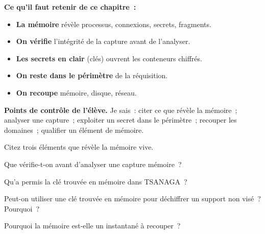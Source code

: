 \separateur

\begin{boxresume}
\textbf{Ce qu'il faut retenir de ce chapitre~:}
\begin{itemize}
    \item \textbf{La mémoire} révèle processus, connexions, secrets,
          fragments.
    \item \textbf{On vérifie} l'intégrité de la capture avant de l'analyser.
    \item \textbf{Les secrets en clair} (clés) ouvrent les conteneurs
          chiffrés.
    \item \textbf{On reste dans le périmètre} de la réquisition.
    \item \textbf{On recoupe} mémoire, disque, réseau.
\end{itemize}
\end{boxresume}

\begin{boxinfo}
\textbf{Points de contrôle de l'élève.} Je sais~: citer ce que révèle la
mémoire~; analyser une capture~; exploiter un secret dans le périmètre~;
recouper les domaines~; qualifier un élément de mémoire.
\end{boxinfo}

\bigskip

\begin{boxexo}[title={\ding{45}\quad Exercice~12.1. Révélations \niveaubase}]
Citez trois éléments que révèle la mémoire vive.
\end{boxexo}

\begin{boxexo}[title={\ding{45}\quad Exercice~12.2. Intégrité \niveaubase}]
Que vérifie-t-on avant d'analyser une capture mémoire~?
\end{boxexo}

\begin{boxexo}[title={\ding{45}\quad Exercice~12.3. La clé \niveaubase}]
Qu'a permis la clé trouvée en mémoire dans TSANAGA~?
\end{boxexo}

\begin{boxexo}[title={\ding{45}\quad Exercice~12.4. Périmètre \niveaumoyen}]
Peut-on utiliser une clé trouvée en mémoire pour déchiffrer un support non
visé~? Pourquoi~?
\end{boxexo}

\begin{boxexo}[title={\ding{45}\quad Exercice~12.5. Instantané \niveaumoyen}]
Pourquoi la mémoire est-elle un instantané à recouper~?
\end{boxexo}


